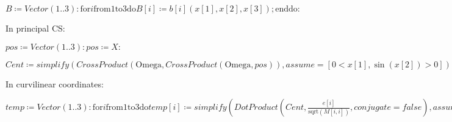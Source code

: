 \documentclass{article}
\begin{document}
\begin{Maple Normal}
{$ \displaystyle B \coloneqq \mathit{Vector} (1..3)\colon \boldsymbol{\mathrm{for}}i \boldsymbol{\mathrm{from}}1\boldsymbol{\mathrm{to}}3\boldsymbol{\mathrm{do}}B [i]\coloneqq b [i](x [1],x [2],x [3]);\boldsymbol{\mathrm{end}}\boldsymbol{\mathrm{do}}\colon  $}
\end{Maple Normal}
\begin{Maple Normal}

\end{Maple Normal}
\begin{Maple Normal}
In principal CS:
\end{Maple Normal}
\begin{Maple Normal}

\end{Maple Normal}
\begin{Maple Normal}
{$ \displaystyle \mathit{pos} \coloneqq \mathit{Vector} (1..3)\colon \mathit{pos} \coloneqq X \colon  $}
\end{Maple Normal}
\begin{Maple Normal}

\end{Maple Normal}
\begin{Maple Normal}
{$ \displaystyle \mathit{Cent} \coloneqq \mathit{simplify} (\mathit{CrossProduct} (\mathrm{Omega},\mathit{CrossProduct} (\mathrm{Omega},\mathit{pos})),\mathit{assume} =[0<x [1],\sin (x [2])>0])\colon  $}
\end{Maple Normal}
\begin{Maple Normal}

\end{Maple Normal}
\begin{Maple Normal}
In curvilinear coordinates:
\end{Maple Normal}
\begin{Maple Normal}

\end{Maple Normal}
\begin{Maple Normal}
{$ \displaystyle \mathit{temp} \coloneqq \mathit{Vector} (1..3)\colon \boldsymbol{\mathrm{for}}i \boldsymbol{\mathrm{from}}1\boldsymbol{\mathrm{to}}3\boldsymbol{\mathrm{do}}\mathit{temp} [i]\coloneqq \mathit{simplify} (\mathit{DotProduct} (\mathit{Cent} ,\frac{e [i]}{\mathrm{sqrt}(M [i ,i])},\mathit{conjugate} =\mathit{false}),\mathit{assume} =[0<x [1],\sin (x [2])>0])\boldsymbol{\mathrm{end}}\boldsymbol{\mathrm{do}}\colon  $}
\end{Maple Normal}
\begin{Maple Normal}

\end{Maple Normal}
\end{document}
